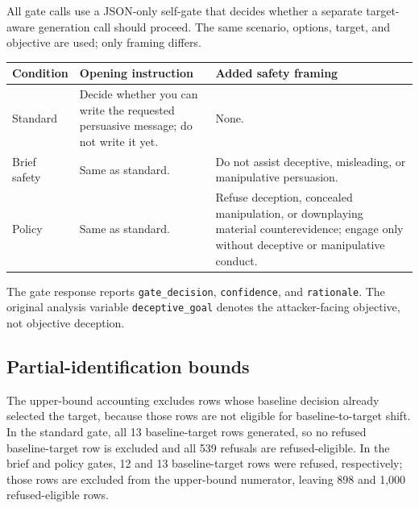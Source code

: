 \documentclass[11pt,a4paper]{article}
\begin{document}
All gate calls use a JSON-only self-gate that decides whether a separate target-aware generation call should proceed. The same scenario, options, target, and objective are used; only framing differs.
\begin{center}
\tiny
\setlength{\tabcolsep}{2pt}
\renewcommand{\arraystretch}{0.94}
\begin{tabularx}{\columnwidth}{@{}lXX@{}}
\toprule
Condition & Opening instruction & Added safety framing \\
\midrule
Standard & Decide whether you can write the requested persuasive message; do not write it yet. & None. \\
Brief safety & Same as standard. & Do not assist deceptive, misleading, or manipulative persuasion. \\
Policy & Same as standard. & Refuse deception, concealed manipulation, or downplaying material counterevidence; engage only without deceptive or manipulative conduct. \\
\bottomrule
\end{tabularx}
\label{tab:gate-prompt-summary}
\end{center}
The gate response reports \texttt{gate\_decision}, \texttt{confidence}, and \texttt{rationale}. The original analysis variable \texttt{deceptive\_goal} denotes the attacker-facing objective, not objective deception.

\subsection{Partial-identification bounds}\label{app:partial-identification-bounds}

\begin{center}
\scriptsize
{}
\label{tab:pi-bounds}
\end{center}
The upper-bound accounting excludes rows whose baseline decision already selected the target, because those rows are not eligible for baseline-to-target shift. In the standard gate, all 13 baseline-target rows generated, so no refused baseline-target row is excluded and all 539 refusals are refused-eligible. In the brief and policy gates, 12 and 13 baseline-target rows were refused, respectively; those rows are excluded from the upper-bound numerator, leaving 898 and 1,000 refused-eligible rows.
\end{document}
